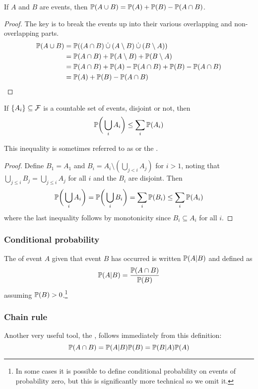 \begin{proposition}
If $A$ and $B$ are events, then $\mathbb{P}(A \cup B) = \mathbb{P}(A) + \mathbb{P}(B) - \mathbb{P}(A \cap B)$.
\end{proposition}
\begin{proof}
The key is to break the events up into their various overlapping and non-overlapping parts.
\begin{align*}
\mathbb{P}(A \cup B) &= \mathbb{P}((A \cap B) \mathbin{\dot{\cup}} (A \setminus B) \mathbin{\dot{\cup}} (B \setminus A)) \\
&= \mathbb{P}(A \cap B) + \mathbb{P}(A \setminus B) + \mathbb{P}(B \setminus A) \\
&= \mathbb{P}(A \cap B) + \mathbb{P}(A) - \mathbb{P}(A \cap B) + \mathbb{P}(B) - \mathbb{P}(A \cap B) \\
&= \mathbb{P}(A) + \mathbb{P}(B) - \mathbb{P}(A \cap B)
\end{align*}
\end{proof}

\begin{proposition}
If $\{A_i\} \subseteq \mathcal{F}$ is a countable set of events, disjoint or not, then
\[\mathbb{P}\bigg(\bigcup_i A_i\bigg) \leq \sum_i \mathbb{P}(A_i)\]
\end{proposition}
This inequality is sometimes referred to as  or the .
\begin{proof}
Define $B_1 = A_1$ and $B_i = A_i \setminus (\bigcup_{j < i} A_j)$ for $i > 1$, noting that $\bigcup_{j \leq i} B_j = \bigcup_{j \leq i} A_j$ for all $i$ and the $B_i$ are disjoint.
Then
\[\mathbb{P}\bigg(\bigcup_i A_i\bigg) = \mathbb{P}\bigg(\bigcup_i B_i\bigg) = \sum_i \mathbb{P}(B_i) \leq \sum_i \mathbb{P}(A_i)\]
where the last inequality follows by monotonicity since $B_i \subseteq A_i$ for all $i$.
\end{proof}

\subsubsection{Conditional probability}
The  of event $A$ given that event $B$ has occurred is written $\mathbb{P}(A | B)$ and defined as
\[\mathbb{P}(A | B) = \frac{\mathbb{P}(A \cap B)}{\mathbb{P}(B)}\]
assuming $\mathbb{P}(B) > 0$.\footnote{
    In some cases it is possible to define conditional probability on events of probability zero, but this is significantly more technical so we omit it.
}

\subsubsection{Chain rule}
Another very useful tool, the , follows immediately from this definition:
\[\mathbb{P}(A \cap B) = \mathbb{P}(A | B)\mathbb{P}(B) = \mathbb{P}(B | A)\mathbb{P}(A)\]

